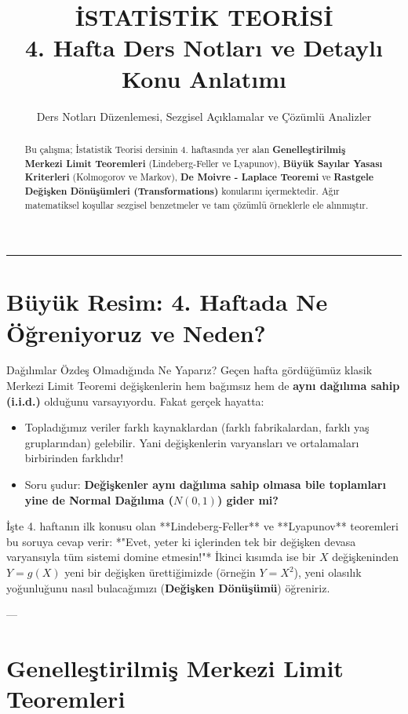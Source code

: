 \documentclass[12pt,a4paper]{article}
\title{\textbf{İSTATİSTİK TEORİSİ}\\[0.3em] \Large 4. Hafta Ders Notları ve Detaylı Konu Anlatımı}
\author{Ders Notları Düzenlemesi, Sezgisel Açıklamalar ve Çözümlü Analizler}
\date{}
\begin{document}
\maketitle

\begin{abstract}
Bu çalışma; İstatistik Teorisi dersinin 4. haftasında yer alan \textbf{Genelleştirilmiş Merkezi Limit Teoremleri} (Lindeberg-Feller ve Lyapunov), \textbf{Büyük Sayılar Yasası Kriterleri} (Kolmogorov ve Markov), \textbf{De Moivre - Laplace Teoremi} ve \textbf{Rastgele Değişken Dönüşümleri (Transformations)} konularını içermektedir. Ağır matematiksel koşullar sezgisel benzetmeler ve tam çözümlü örneklerle ele alınmıştır.
\end{abstract}

\hrule
\vspace{1em}

\section{Büyük Resim: 4. Haftada Ne Öğreniyoruz ve Neden?}

\begin{sezgi}{Dağılımlar Özdeş Olmadığında Ne Yaparız?}
Geçen hafta gördüğümüz klasik Merkezi Limit Teoremi değişkenlerin hem bağımsız hem de \textbf{aynı dağılıma sahip (i.i.d.)} olduğunu varsayıyordu.  
Fakat gerçek hayatta:
\begin{itemize}
    \item Topladığımız veriler farklı kaynaklardan (farklı fabrikalardan, farklı yaş gruplarından) gelebilir. Yani değişkenlerin varyansları ve ortalamaları birbirinden farklıdır!
    \item Soru şudur: \textbf{Değişkenler aynı dağılıma sahip olmasa bile toplamları yine de Normal Dağılıma ($N(0,1)$) gider mi?}
\end{itemize}
İşte 4. haftanın ilk konusu olan **Lindeberg-Feller** ve **Lyapunov** teoremleri bu soruya cevap verir: *"Evet, yeter ki içlerinden tek bir değişken devasa varyansıyla tüm sistemi domine etmesin!"*  
İkinci kısımda ise bir $X$ değişkeninden $Y = g(X)$ yeni bir değişken ürettiğimizde (örneğin $Y = X^2$), yeni olasılık yoğunluğunu nasıl bulacağımızı (\textbf{Değişken Dönüşümü}) öğreniriz.
\end{sezgi}

---

\section{Genelleştirilmiş Merkezi Limit Teoremleri}
\end{document}
